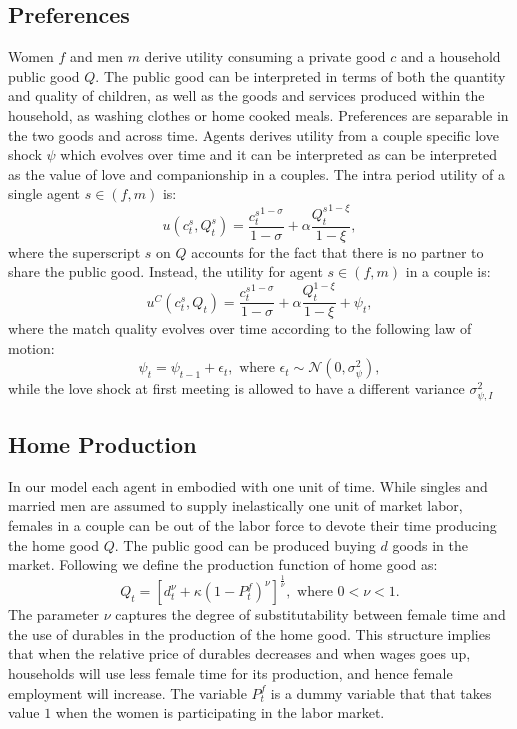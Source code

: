 \documentclass[12pt]{article}
\numberwithin{table}{section}
\begin{document}
\subsection{Preferences}
Women $f$ and men $m$ derive utility consuming a private good  $c$ and a household public good $Q$. The public good can be interpreted in terms of both the quantity and quality of children, as well as the goods and services produced within the household, as washing clothes  or home cooked meals. Preferences are separable in the two goods and across time.
Agents derives utility from a couple specific love shock $\psi$ which evolves over time and it can be interpreted as  can be interpreted as the value of love and companionship in a couples. The intra period utility of a single agent $s\in(f,m)$ is:
\[u(c^s_t,Q^s_t)=\frac{{c^s_t}^{1-\sigma}}{1-\sigma}+\alpha\frac{{Q^s_t}^{1-\xi}}{1-\xi},\]
where the superscript $s$ on $Q$ accounts for the fact that there is no partner to share the public good. Instead, the utility for  agent $s\in(f,m)$ in a couple is:
\[u^{C}(c^s_t,Q_t)=\frac{{c_t^s}^{1-\sigma}}{1-\sigma}+\alpha\frac{Q_t^{1-\xi}}{1-\xi}+\psi_t,\]
where the match quality evolves over time according to the following law of motion:
\[\psi_t=\psi_{t-1}+\epsilon_t,\text{ where }\epsilon_t \sim\mathcal{N}(0,\sigma^2_{\psi}), \]
while the love shock at first meeting is allowed to have a different variance $\sigma^2_{\psi,I}$
\subsection{Home Production}
In our model each agent in embodied with one unit of time. While singles and married men are assumed to supply inelastically one unit of market labor, females in a couple can be out of the labor force to devote their time producing the home good $Q$. The public good can be produced buying $d$ goods in the market. Following \cite{greenwood2016} we define the production function of home good as:
\begin{equation}\label{eq:pfunction}
Q_t=[d_t^\nu+\kappa {(1-P^f_t)}^\nu]^{\frac{1}{\nu}}, \text{ where }0<\nu<1.
\end{equation}
The parameter $\nu$ captures the degree of  substitutability between female time and the use of durables in the production of the home good. This structure implies that when the relative price of durables decreases and when wages goes up, households will use less female time for its production, and hence female employment will increase. The variable  $P^f_t$ is a dummy variable that that takes value $1$ when the women is participating in the labor market.
\end{document}
